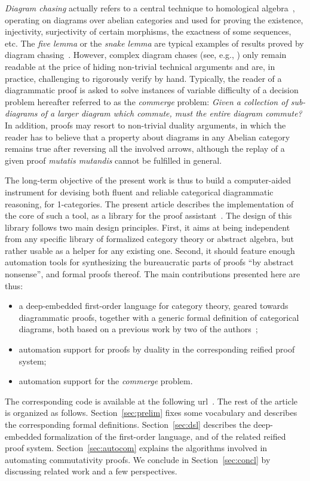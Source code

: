 \documentclass[a4paper,UKenglish,cleveref, autoref, thm-restate]{lipics-v2021}
\begin{document}
\emph{Diagram chasing} actually refers to a central technique to homological algebra~\cite{zbMATH00758278,zbMATH01324388}, operating on diagrams over abelian categories and used for proving the existence, injectivity, surjectivity of certain morphisms, the exactness of some sequences, etc. The \emph{five lemma} or the \emph{snake lemma} are typical examples of results proved by diagram chasing~\cite{zbMATH00758278}. However, complex diagram chases (see, e.g., \cite[p.338]{piquerez:tel-03499730}) only remain readable at the price of hiding non-trivial technical arguments and are, in practice, challenging to rigorously verify by hand. Typically, the reader of a diagrammatic proof is asked to solve instances of variable difficulty of a decision problem hereafter referred to as the \emph{commerge} problem: \emph{Given a collection of sub-diagrams of a larger diagram which commute, must the entire diagram commute?} In addition, proofs may resort to non-trivial duality arguments, in which the reader has to believe that a property about diagrams in any Abelian category remains true after reversing all the involved arrows, although the replay of a given proof \emph{mutatis mutandis} cannot be fulfilled in general.

The long-term objective of the present work is thus to build a computer-aided instrument for devising both fluent and reliable categorical diagrammatic reasoning, for 1-categories. The present article describes the implementation of the core of such a tool, as a library for the \Coq{} proof assistant~\cite{the_coq_development_team_2023_8161141}. The design of this library follows two main design principles. First, it aims at being independent from any specific library of formalized category theory or abstract algebra, but rather usable as a helper for any existing one. Second, it should feature enough automation tools for synthesizing the bureaucratic parts of proofs \enquote{by abstract nonsense}, and formal proofs thereof. The main contributions presented here are thus:
\begin{itemize}
  \item a deep-embedded first-order language for category theory, geared towards diagrammatic proofs, together with a generic formal definition of categorical diagrams, both based on a previous work by two of the authors~\cite{DBLP:conf/csl/MahboubiP24};
  \item automation support for proofs by duality in the corresponding reified proof system;
  \item automation support for the \emph{commerge} problem.
\end{itemize}
The corresponding code is available at the following url~\cite{repo}. The rest of the article is organized as follows. Section~\ref{sec:prelim} fixes some vocabulary and describes the corresponding formal definitions. Section~\ref{sec:dsl} describes the deep-embedded formalization of the first-order language, and of the related reified proof system. Section~\ref{sec:autocom} explains the algorithms involved in automating commutativity proofs. We conclude in Section~\ref{sec:concl} by discussing related work and a few perspectives.
\end{document}

